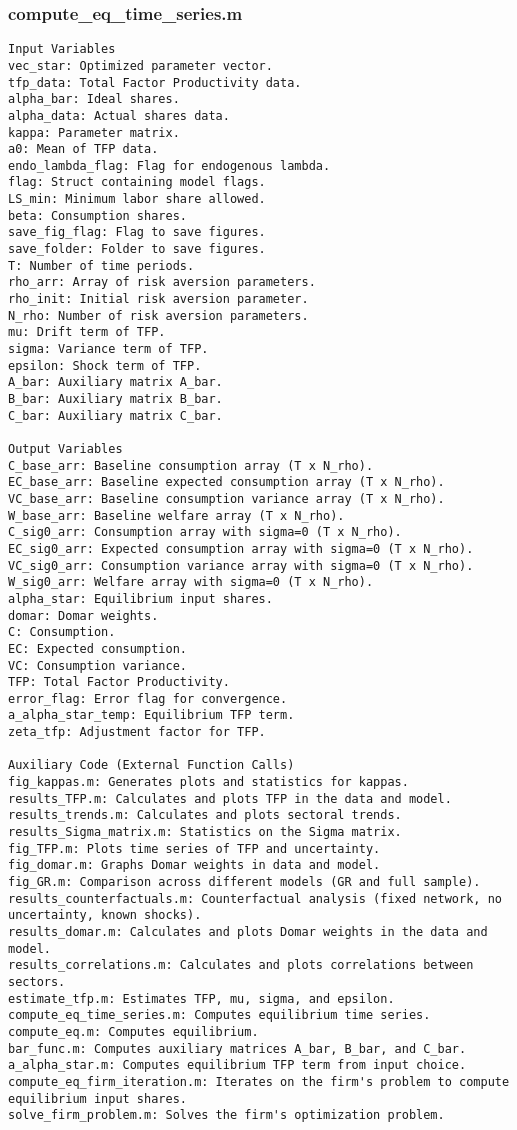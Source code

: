 \documentclass[11pt]{article}
\theoremstyle{definition}
\newcommand{\codepath}{F:/12004835/replication_package_final/replication_package_final}
\begin{document}
	\subsubsection{compute\_eq\_time\_series.m}
	\begin{lstlisting}[style=Matlab]
Input Variables
vec_star: Optimized parameter vector.
tfp_data: Total Factor Productivity data.
alpha_bar: Ideal shares.
alpha_data: Actual shares data.
kappa: Parameter matrix.
a0: Mean of TFP data.
endo_lambda_flag: Flag for endogenous lambda.
flag: Struct containing model flags.
LS_min: Minimum labor share allowed.
beta: Consumption shares.
save_fig_flag: Flag to save figures.
save_folder: Folder to save figures.
T: Number of time periods.
rho_arr: Array of risk aversion parameters.
rho_init: Initial risk aversion parameter.
N_rho: Number of risk aversion parameters.
mu: Drift term of TFP.
sigma: Variance term of TFP.
epsilon: Shock term of TFP.
A_bar: Auxiliary matrix A_bar.
B_bar: Auxiliary matrix B_bar.
C_bar: Auxiliary matrix C_bar.

Output Variables
C_base_arr: Baseline consumption array (T x N_rho).
EC_base_arr: Baseline expected consumption array (T x N_rho).
VC_base_arr: Baseline consumption variance array (T x N_rho).
W_base_arr: Baseline welfare array (T x N_rho).
C_sig0_arr: Consumption array with sigma=0 (T x N_rho).
EC_sig0_arr: Expected consumption array with sigma=0 (T x N_rho).
VC_sig0_arr: Consumption variance array with sigma=0 (T x N_rho).
W_sig0_arr: Welfare array with sigma=0 (T x N_rho).
alpha_star: Equilibrium input shares.
domar: Domar weights.
C: Consumption.
EC: Expected consumption.
VC: Consumption variance.
TFP: Total Factor Productivity.
error_flag: Error flag for convergence.
a_alpha_star_temp: Equilibrium TFP term.
zeta_tfp: Adjustment factor for TFP.

Auxiliary Code (External Function Calls)
fig_kappas.m: Generates plots and statistics for kappas.
results_TFP.m: Calculates and plots TFP in the data and model.
results_trends.m: Calculates and plots sectoral trends.
results_Sigma_matrix.m: Statistics on the Sigma matrix.
fig_TFP.m: Plots time series of TFP and uncertainty.
fig_domar.m: Graphs Domar weights in data and model.
fig_GR.m: Comparison across different models (GR and full sample).
results_counterfactuals.m: Counterfactual analysis (fixed network, no uncertainty, known shocks).
results_domar.m: Calculates and plots Domar weights in the data and model.
results_correlations.m: Calculates and plots correlations between sectors.
estimate_tfp.m: Estimates TFP, mu, sigma, and epsilon.
compute_eq_time_series.m: Computes equilibrium time series.
compute_eq.m: Computes equilibrium.
bar_func.m: Computes auxiliary matrices A_bar, B_bar, and C_bar.
a_alpha_star.m: Computes equilibrium TFP term from input choice.
compute_eq_firm_iteration.m: Iterates on the firm's problem to compute equilibrium input shares.
solve_firm_problem.m: Solves the firm's optimization problem.
	\end{lstlisting}
	
	
\end{document}
